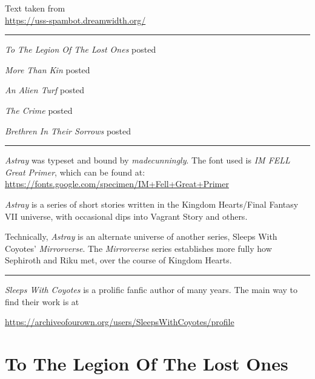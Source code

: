 \documentclass[a5paper,12pt,twoside,onecolumn,openright,showtrim,draft]{memoir}
\begin{document}
\clearpage
\thispagestyle{plain}
\begin{flushleft}
\begin{SingleSpace} 
\small{
Text taken from\\ \url{https://uss-spambot.dreamwidth.org/}

\pfbreak

\textit{To The Legion Of The Lost Ones} posted 

\textit{More Than Kin} posted 

\textit{An Alien Turf} posted 

\textit{The Crime} posted 

\textit{Brethren In Their Sorrows} posted  

\pfbreak

\textit{Astray} was typeset and bound by \emph{madecunningly}. 
The font used is \textit{IM FELL Great Primer}, which can be found at:\\ \url{https://fonts.google.com/specimen/IM+Fell+Great+Primer}
}
\end{SingleSpace}
\end{flushleft}
\clearpage
\thispagestyle{plain}
\begin{SingleSpace}
\begin{midsloppypar}
\textit{Astray} is a series of short stories written in the Kingdom Hearts/Final Fantasy VII universe, with occasional dips into Vagrant Story and others. 

Technically, \textit{Astray} is an alternate universe of another series, Sleeps 
With Coyotes' \textit{Mirrorverse}. The \textit{Mirrorverse} series establishes more fully how Sephiroth and Riku met, over the course of Kingdom Hearts.  

\pfbreak

\textit{Sleeps With Coyotes} is a prolific fanfic author of many years. The main way to find their work is at 

\url{https://archiveofourown.org/users/SleepsWithCoyotes/profile}
\end{midsloppypar}
\end{SingleSpace}



\cleartorecto
\thispagestyle{plain}


\clearpage
\cleartorecto


\mainmatter
\pagestyle{myheadings}
\cleartorecto
\part*{To The Legion Of The Lost Ones}

\clearforchapter
\end{document}

